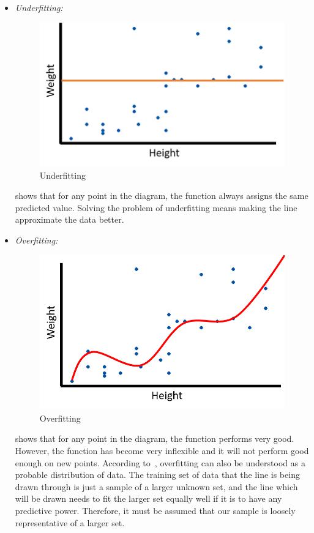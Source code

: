 \begin{itemize}
	\item \textit{Underfitting:}
	\begin{figure}
		\centering
		\includegraphics[scale=0.4]{img/underfit.png}
		\caption{Underfitting~\cite{gs}}
		\label{fig:underfit}
	\end{figure}
	 shows that for any point in the diagram, the function always assigns the same predicted value. Solving the problem of underfitting means making the line approximate the data better.
	\item \textit{Overfitting:} 
	\begin{figure}
		\centering
		\includegraphics[scale=0.4]{img/overfit.png}
		\caption{Overfitting~\cite{gs}}
		\label{fig:overfit}
	\end{figure}
	 shows that for any point in the diagram, the function performs very good. However, the function has become very inflexible and it will not perform good enough on new points. According to~\cite{tfidf}, overfitting can also be understood as a probable distribution of data. The training set of data that the line is being drawn through is just a sample of a larger unknown set, and the line which will be drawn needs to fit the larger set equally well if it is to have any predictive power. Therefore, it must be assumed that our sample is loosely representative of a larger set.
\end{itemize}

